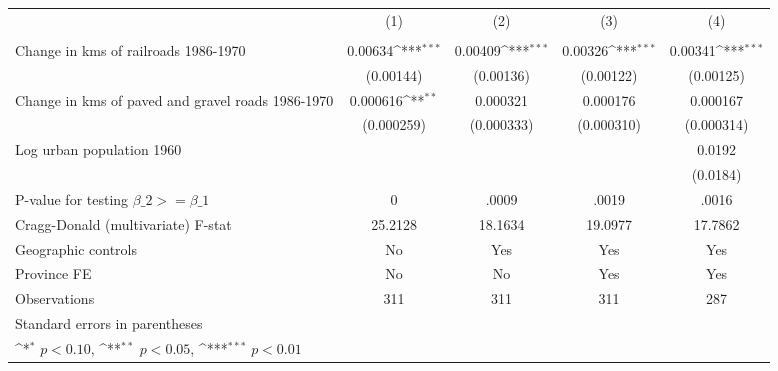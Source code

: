 {
\def\sym#1{\ifmmode^{#1}\else\(^{#1}\)\fi}
\begin{tabular}{l*{4}{c}}
\hline\hline
                &\multicolumn{1}{c}{(1)}&\multicolumn{1}{c}{(2)}&\multicolumn{1}{c}{(3)}&\multicolumn{1}{c}{(4)}\\
                &\multicolumn{1}{c}{}&\multicolumn{1}{c}{}&\multicolumn{1}{c}{}&\multicolumn{1}{c}{}\\
\hline
Change in kms of railroads 1986-1970&  0.00634\sym{***}&  0.00409\sym{***}&  0.00326\sym{***}&  0.00341\sym{***}\\
                &(0.00144)         &(0.00136)         &(0.00122)         &(0.00125)         \\
[1em]
Change in kms of paved and gravel roads 1986-1970& 0.000616\sym{**} & 0.000321         & 0.000176         & 0.000167         \\
                &(0.000259)         &(0.000333)         &(0.000310)         &(0.000314)         \\
[1em]
Log urban population 1960&                  &                  &                  &   0.0192         \\
                &                  &                  &                  & (0.0184)         \\
\hline
P-value for testing $\beta\_{2} >= \beta\_{1}$&        0         &    .0009         &    .0019         &    .0016         \\
Cragg-Donald (multivariate) F-stat&  25.2128         &  18.1634         &  19.0977         &  17.7862         \\
Geographic controls&       No         &      Yes         &      Yes         &      Yes         \\
Province FE     &       No         &       No         &      Yes         &      Yes         \\
Observations    &      311         &      311         &      311         &      287         \\
\hline\hline
\multicolumn{5}{l}{\footnotesize Standard errors in parentheses}\\
\multicolumn{5}{l}{\footnotesize \sym{*} \(p<0.10\), \sym{**} \(p<0.05\), \sym{***} \(p<0.01\)}\\
\end{tabular}
}
